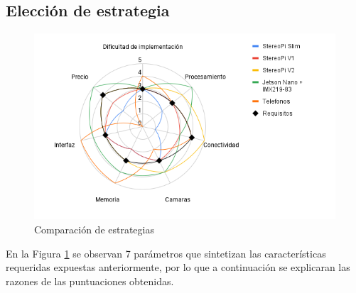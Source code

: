 \subsection{Elección de estrategia}
\begin{figure}[H]
    \centering
    \includegraphics[scale=0.5]{Recursos/spyder_chart.png}
    \caption{Comparación de estrategias}
    \label{spyder_chart}
\end{figure}
En la Figura \ref{spyder_chart} se observan 7 parámetros que sintetizan las características requeridas expuestas anteriormente, por lo que a continuación se explicaran las razones de las puntuaciones obtenidas.
